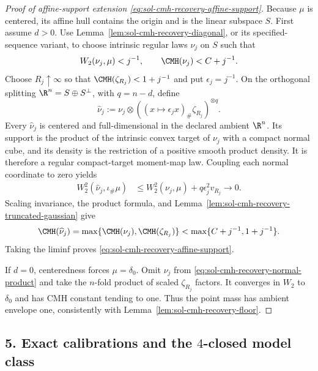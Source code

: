 \documentclass[../main.tex]{subfiles}
\begin{document}
\begin{proof}[Proof of affine-support extension \eqref{eq:sol-cmh-recovery-affine-support}]
Because $\mu$ is centered, its affine hull contains the origin and is the linear subspace $S$.
First assume $d>0$.  Use Lemma~\ref{lem:sol-cmh-recovery-diagonal}, or its specified-sequence
variant, to choose intrinsic regular laws $\nu_j$ on $S$ such that
\begin{equation}
  W_2(\nu_j,\mu)<j^{-1},
  \qquad
  \CMH(\nu_j)<C+j^{-1}.
  \label{eq:sol-cmh-recovery-intrinsic-good}
\end{equation}
Choose $R_j\uparrow\infty$ so that
$\CMH(\zeta_{R_j})<1+j^{-1}$ and put $\epsilon_j=j^{-1}$.  On the orthogonal splitting
$\R^n=S\oplus S^\perp$, with $q=n-d$, define
\begin{equation}
  \widehat\nu_j
  :=\nu_j\otimes
  \left((x\mapsto\epsilon_jx)_\#\zeta_{R_j}\right)^{\otimes q}.
  \label{eq:sol-cmh-recovery-normal-product}
\end{equation}
Every $\widehat\nu_j$ is centered and full-dimensional in the declared ambient $\R^n$.  Its
support is the product of the intrinsic convex target of $\nu_j$ with a compact normal cube,
and its density is the restriction of a positive smooth product density.  It is therefore a
regular compact-target moment-map law.  Coupling each normal coordinate to zero yields
\begin{align*}
  W_2^2(\widehat\nu_j,\iota_\#\mu)
  &\le W_2^2(\nu_j,\mu)+q\epsilon_j^2v_{R_j}
  \longrightarrow0.
\end{align*}
Scaling invariance, the product formula, and
Lemma~\ref{lem:sol-cmh-recovery-truncated-gaussian} give
\[
  \CMH(\widehat\nu_j)
  =\max\{\CMH(\nu_j),\CMH(\zeta_{R_j})\}
  <\max\{C+j^{-1},1+j^{-1}\}.
\]
Taking the liminf proves \eqref{eq:sol-cmh-recovery-affine-support}.

If $d=0$, centeredness forces $\mu=\delta_0$.  Omit $\nu_j$ from
\eqref{eq:sol-cmh-recovery-normal-product} and take the $n$-fold product of scaled
$\zeta_{R_j}$ factors.  It converges in $W_2$ to $\delta_0$ and has CMH constant tending to
one.  Thus the point mass has ambient envelope one, consistently with
Lemma~\ref{lem:sol-cmh-recovery-floor}.
\end{proof}

\subsection*{5. Exact calibrations and the $4$-closed model class}
\end{document}
